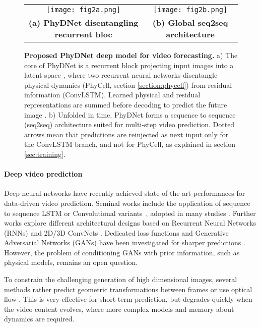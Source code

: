 \documentclass[10pt,twocolumn,letterpaper]{article}
\begin{document}
\begin{figure*}
    \centering
    \begin{tabular}{cc}
        \texttt{[image: fig2a.png]} & \texttt{[image: fig2b.png]}  \\
        \textbf{(a) PhyDNet disentangling recurrent bloc} & \textbf{(b) Global seq2seq architecture} \vspace{0.2cm}
    \end{tabular}{}
    \caption{\textbf{Proposed PhyDNet deep model for video forecasting.} a) The core of PhyDNet is a recurrent block projecting input images  into a latent space , where two recurrent neural networks disentangle physical dynamics (PhyCell, section \ref{section:phycell}) from residual information (ConvLSTM). Learned physical  and residual  representations are summed before decoding to predict the future image . b) Unfolded in time, PhyDNet forms a sequence to sequence (seq2seq) architecture suited for multi-step video prediction. Dotted arrows mean that  predictions are reinjected as next input only for the ConvLSTM branch, and not for PhyCell, as explained in section \ref{sec:training}.}
    \label{fig:fig2}
\end{figure*}


\paragraph{Deep video prediction} 
Deep neural networks have recently achieved state-of-the-art performances for data-driven video prediction. Seminal works include the application of sequence to sequence LSTM  or Convolutional variants~\cite{srivastava2015unsupervised,xingjian2015convolutional}, adopted in many studies \cite{finn2016unsupervised,lu2017flexible,xu2018structure}. Further works explore different architectural designs based on Recurrent Neural Networks (RNNs) \cite{wang2017predrnn,wang2018predrnn++,oliu2018folded,wang2019memory,wang2018eidetic} and 2D/3D ConvNets \cite{mathieu2015deep,vondrick2016generating,reda2018sdc,byeon2018contextvp}. Dedicated loss functions \cite{cuturi2017soft,leguen19} and Generative Adversarial Networks (GANs) have been investigated for sharper predictions \cite{mathieu2015deep,vondrick2016generating,kwon2019predicting}. However, the problem of conditioning GANs with prior information, such as physical models, remains an open question. 

To constrain the challenging generation of high dimensional images, several methods rather predict geometric transformations between frames \cite{finn2016unsupervised,jia2016dynamic,xue2016visual} or use optical flow \cite{patraucean2015spatio,luo2017unsupervised,liu2017video,liang2017dual,li2018flow}. This is very effective for short-term prediction, but degrades quickly when the video content evolves, where more complex models and memory about dynamics are required. 
\end{document}
